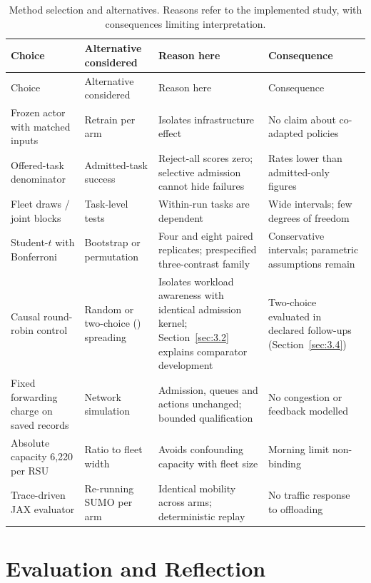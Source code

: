 \documentclass[12pt,a4paper]{article}
\begin{document}
\begingroup
\singlespacing\footnotesize\setlength{\tabcolsep}{3pt}
\renewcommand{\thetable}{3a}
\begin{xltabular}{\textwidth}{@{}YYYY@{}}
\caption[Method selection and alternatives]{Method selection and alternatives. Reasons refer to the implemented study, with consequences limiting interpretation.}\label{tab:3a} \\
\toprule
Choice & Alternative considered & Reason here & Consequence \\
\midrule\endfirsthead
\toprule
Choice & Alternative considered & Reason here & Consequence \\
\midrule\endhead
\bottomrule\endfoot
Frozen actor with matched inputs & Retrain per arm & Isolates infrastructure effect & No claim about co-adapted policies \\
Offered-task denominator & Admitted-task success & Reject-all scores zero; selective admission cannot hide failures & Rates lower than admitted-only figures \\
Fleet draws / joint blocks & Task-level tests & Within-run tasks are dependent & Wide intervals; few degrees of freedom \\
Student-$t$ with Bonferroni & Bootstrap or permutation & Four and eight paired replicates; prespecified three-contrast family & Conservative intervals; parametric assumptions remain \\
Causal round-robin control & Random or two-choice () spreading & Isolates workload awareness with identical admission kernel; Section~\ref{sec:3.2} explains comparator development & Two-choice evaluated in declared follow-ups (Section~\ref{sec:3.4}) \\
Fixed forwarding charge on saved records & Network simulation & Admission, queues and actions unchanged; bounded qualification & No congestion or feedback modelled \\
Absolute capacity 6,220 per RSU & Ratio to fleet width & Avoids confounding capacity with fleet size & Morning limit non-binding \\
Trace-driven JAX evaluator & Re-running SUMO per arm & Identical mobility across arms; deterministic replay & No traffic response to offloading \\
\end{xltabular}
\endgroup

\FloatBarrier
\section{Evaluation and Reflection}\label{sec:3}
\end{document}
